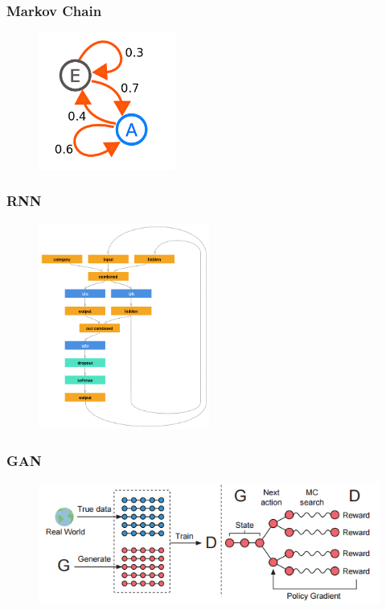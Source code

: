 \documentclass{beamer}
\begin{document}
\begin{frame} [fragile]
  \frametitle{Markov Chain}
  \begin{figure}[h]
  \center
  \includegraphics[width=0.4\textwidth]{markov}
  \end{figure}
\end{frame}

\begin{frame} [fragile]
  \frametitle{RNN}

  \begin{figure}[h]
  \center
  \includegraphics[width=0.5\textwidth]{rnn}
  \end{figure}
\end{frame}

\begin{frame} [fragile]
  \frametitle{GAN}

  \begin{figure}[h]
  \center
  \includegraphics[width=\textwidth]{seqgan}
  \end{figure}
\end{frame}
\end{document}
